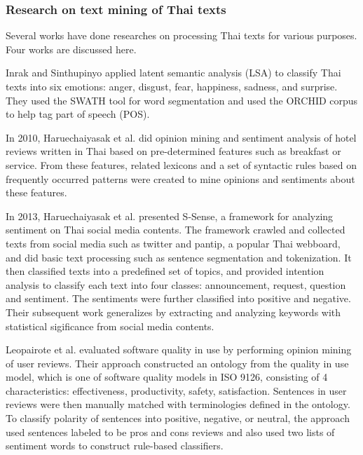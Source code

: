 \subsubsection{Research on text mining of Thai texts} Several works have done researches on processing Thai texts for various purposes. Four works are discussed here.

Inrak and Sinthupinyo \cite{emotioninthai} applied latent semantic analysis (LSA) \cite{LSA} to classify Thai texts into six emotions: anger, disgust, fear, happiness, sadness, and surprise. They used the SWATH \cite{SWATH} tool for word segmentation and used the ORCHID \cite{ORCHID} corpus to help tag part of speech (POS).

In 2010, Haruechaiyasak et al. \cite{thaiopinionmininghotel} did opinion mining and sentiment analysis of hotel reviews written in Thai based on pre-determined features such as breakfast or service. From these features, related lexicons and a set of syntactic rules based on frequently occurred patterns were created to mine opinions and sentiments about these features.

In 2013, Haruechaiyasak et al. \cite{ssense,ssense2} presented S-Sense, a framework for analyzing sentiment on Thai social media contents. The framework crawled and collected texts from social media such as twitter and pantip, a popular Thai webboard, and did basic text processing such as sentence segmentation and tokenization. It then classified texts into a predefined set of topics, and provided intention analysis to classify each text into four classes: announcement, request, question and sentiment. The sentiments were further classified into positive and negative. Their subsequent work \cite{ssense2} generalizes by extracting and analyzing keywords with statistical sigificance from social media contents.

Leopairote et al. \cite{Leopairote1,Leopairote2} evaluated software quality in use by performing opinion mining of user reviews. Their approach constructed an ontology from the quality in use model, which is one of software quality models in ISO 9126, consisting of 4 characteristics: effectiveness, productivity, safety, satisfaction. Sentences in user reviews were then manually matched with terminologies defined in the ontology. To classify polarity of sentences into positive, negative, or neutral, the approach used sentences labeled to be pros and cons reviews and also used two lists of sentiment words to construct rule-based classifiers.

